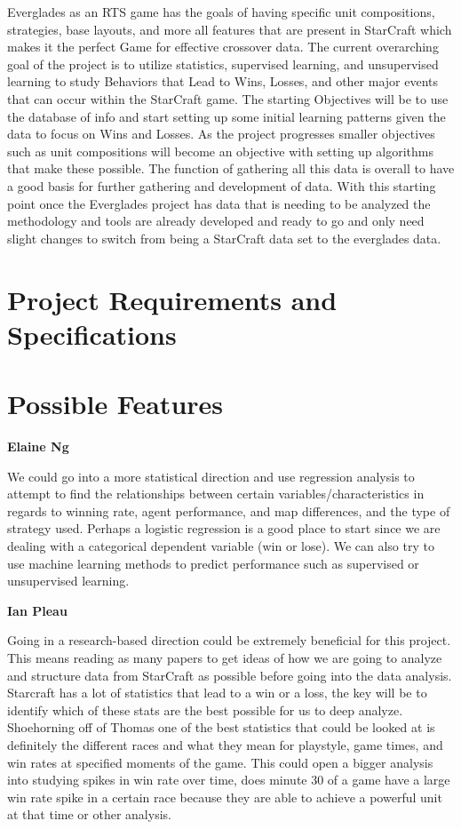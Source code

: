 \documentclass[a4paper,12pt]{report}
\newcommand{\msection}[1]{\noindent\textbf{#1}}
\begin{document}
Everglades as an RTS game has the goals of having specific unit compositions, strategies, base layouts, and more all features that are present in StarCraft which makes it the perfect Game for effective crossover data. The current overarching goal of the project is to utilize statistics, supervised learning, and unsupervised learning to study Behaviors that Lead to Wins, Losses, and other major events that can occur within the StarCraft game. The starting Objectives will be to use the database of info and start setting up some initial learning patterns given the data to focus on Wins and Losses. As the project progresses smaller objectives such as unit compositions will become an objective with setting up algorithms that make these possible.  The function of gathering all this data is overall to have a good basis for further gathering and development of data. With this starting point once the Everglades project has data that is needing to be analyzed the methodology and tools are already developed and ready to go and only need slight changes to switch from being a StarCraft data set to the everglades data.

\section{Project Requirements and Specifications}

\section{Possible Features}

\msection{Elaine Ng}

We could go into a more statistical direction and use regression analysis to attempt to find the relationships between certain variables/characteristics in regards to winning rate, agent performance, and map differences, and the type of strategy used. Perhaps a logistic regression is a good place to start since we are dealing with a categorical dependent variable (win or lose). We can also try to use machine learning methods to predict performance such as supervised or unsupervised learning.

\msection{Ian Pleau}

Going in a research-based direction could be extremely beneficial for this project. This means reading as many papers to get ideas of how we are going to analyze and structure data from StarCraft as possible before going into the data analysis. Starcraft has a lot of statistics that lead to a win or a loss, the key will be to identify which of these stats are the best possible for us to deep analyze. Shoehorning off of Thomas one of the best statistics that could be looked at is definitely the different races and what they mean for playstyle, game times, and win rates at specified moments of the game. This could open a bigger analysis into studying spikes in win rate over time, does minute 30 of a game have a large win rate spike in a certain race because they are able to achieve a powerful unit at that time or other analysis.
\end{document}
